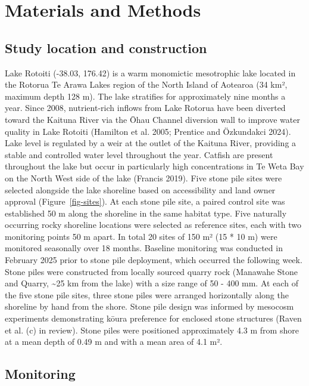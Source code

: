 \documentclass[
  12pt,
  a4paper,
  oneside]{scrbook}
\begin{document}
\section{Materials and Methods}\label{materials-and-methods-3}

\subsection{Study location and
construction}\label{study-location-and-construction}

Lake Rotoiti (-38.03, 176.42) is a warm monomictic mesotrophic lake
located in the Rotorua Te Arawa Lakes region of the North Island of
Aotearoa (34 km², maximum depth 128 m). The lake stratifies for
approximately nine months a year. Since 2008, nutrient-rich inflows from
Lake Rotorua have been diverted toward the Kaituna River via the Ōhau
Channel diversion wall to improve water quality in Lake Rotoiti
(Hamilton et al. 2005; Prentice and Özkundakci 2024). Lake level is
regulated by a weir at the outlet of the Kaituna River, providing a
stable and controlled water level throughout the year. Catfish are
present throughout the lake but occur in particularly high
concentrations in Te Weta Bay on the North West side of the lake
(Francis 2019). Five stone pile sites were selected alongside the lake
shoreline based on accessibility and land owner approval
(Figure~\ref{fig-sites}). At each stone pile site, a paired control site
was established 50 m along the shoreline in the same habitat type. Five
naturally occurring rocky shoreline locations were selected as reference
sites, each with two monitoring points 50 m apart. In total 20 sites of
150 m² (15 * 10 m) were monitored seasonally over 18 months. Baseline
monitoring was conducted in February 2025 prior to stone pile
deployment, which occurred the following week. Stone piles were
constructed from locally sourced quarry rock (Manawahe Stone and Quarry,
\textasciitilde25 km from the lake) with a size range of 50 - 400 mm. At
each of the five stone pile sites, three stone piles were arranged
horizontally along the shoreline by hand from the shore. Stone pile
design was informed by mesocosm experiments demonstrating kōura
preference for enclosed stone structures (Raven et al. (c) in review).
Stone piles were positioned approximately 4.3 m from shore at a mean
depth of 0.49 m and with a mean area of 4.1 m².

\subsection{Monitoring}\label{monitoring}
\end{document}
